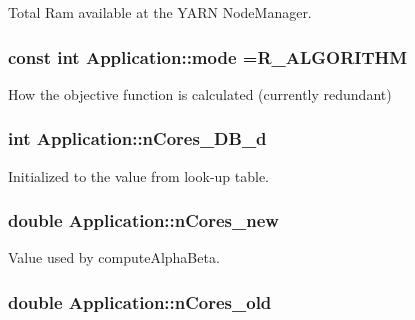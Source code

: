 Total Ram available at the Y\-A\-R\-N Node\-Manager. 

\hypertarget{classApplication_a351cf2c8500b5b5520aeeac8f53c7f74}{
\subsubsection[{mode}]{\setlength{\rightskip}{0pt plus 5cm}const int Application\-::mode ={\bf R\-\_\-\-A\-L\-G\-O\-R\-I\-T\-H\-M}\hspace{0.3cm}{\ttfamily [private]}}}\label{classApplication_a351cf2c8500b5b5520aeeac8f53c7f74}


How the objective function is calculated (currently redundant) 

\hypertarget{classApplication_a95104d330c9c7ed2c1017b4938a39a9a}{
\subsubsection[{n\-Cores\-\_\-\-D\-B\-\_\-d}]{\setlength{\rightskip}{0pt plus 5cm}int Application\-::n\-Cores\-\_\-\-D\-B\-\_\-d\hspace{0.3cm}{\ttfamily [private]}}}\label{classApplication_a95104d330c9c7ed2c1017b4938a39a9a}


Initialized to the value from look-\/up table. 

\hypertarget{classApplication_af7b37c07da0fefef4d86ed3c567b08d2}{
\subsubsection[{n\-Cores\-\_\-new}]{\setlength{\rightskip}{0pt plus 5cm}double Application\-::n\-Cores\-\_\-new\hspace{0.3cm}{\ttfamily [private]}}}\label{classApplication_af7b37c07da0fefef4d86ed3c567b08d2}


Value used by compute\-Alpha\-Beta. 

\hypertarget{classApplication_a425bb14c5264f07d9eafa6f9caa6a8b1}{
\subsubsection[{n\-Cores\-\_\-old}]{\setlength{\rightskip}{0pt plus 5cm}double Application\-::n\-Cores\-\_\-old\hspace{0.3cm}{\ttfamily [private]}}}\label{classApplication_a425bb14c5264f07d9eafa6f9caa6a8b1}


